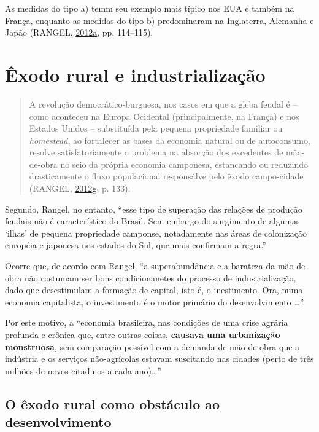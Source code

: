 \documentclass[a4paper, 12pt]{article}
\begin{document}
As medidas do tipo a) temm seu exemplo mais típico nos EUA e também na
França, enquanto as medidas do tipo b) predominaram na Inglaterra,
Alemanha e Japão (RANGEL,
\protect\hyperlink{ref-rangel1954}{2012}\protect\hyperlink{ref-rangel1954}{a},
pp. 114--115).

\hypertarget{exodo-rural-e-industrializacao}{%
\section{Êxodo rural e
industrialização}\label{exodo-rural-e-industrializacao}}

\begin{quote}
A revolução democrático-burguesa, nos casos em que a gleba feudal é --
como aconteceu na Europa Ocidental (principalmente, na França) e nos
Estados Unidos -- substituída pela pequena propriedade familiar ou
\emph{homestead}, ao fortalecer as bases da economia natural ou de
autoconsumo, resolve satisfatoriamente o problema na absorção dos
excedentes de mão-de-obra no seio da própria economia camponesa,
estancando ou reduzindo drasticamente o fluxo populacional responsálve
pelo êxodo campo-cidade (RANGEL,
\protect\hyperlink{ref-rangel1986b}{2012}\protect\hyperlink{ref-rangel1986b}{g},
p. 133).
\end{quote}

Segundo, Rangel, no entanto, ``esse tipo de superação das relações de
produção feudais não é característico do Brasil. Sem embargo do
surgimento de algumas `ilhas' de pequena propriedade camponse,
notadamente nas áreas de colonização européia e japonesa nos estados do
Sul, que mais confirmam a regra.''

Ocorre que, de acordo com Rangel, ``a superabundância e a barateza da
mão-de-obra não costumam ser bons condicionanetes do processo de
industrialização, dado que desestimulam a formação de capital, isto é, o
inestimento. Ora, numa economia capitalista, o investimento é o motor
primário do desenvolvimento \ldots{}''.

Por este motivo, a ``economia brasileira, nas condições de uma crise
agrária profunda e crônica que, entre outras coisas, \textbf{causava uma
urbanização monstruosa}, sem comparação possível com a demanda de
mão-de-obra que a indústria e os serviços não-agrícolas estavam
suscitando nas cidades (perto de três milhões de novos citadinos a cada
ano)\ldots{}''

\hypertarget{o-exodo-rural-como-obstaculo-ao-desenvolvimento}{%
\subsection{O êxodo rural como obstáculo ao
desenvolvimento}\label{o-exodo-rural-como-obstaculo-ao-desenvolvimento}}
\end{document}
